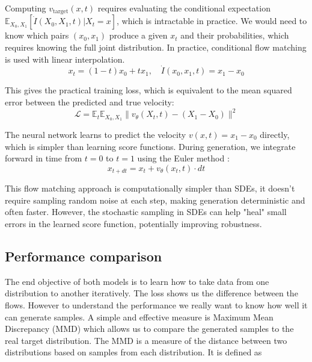 \documentclass[conference,a4paper]{IEEEtran}
\begin{document}
Computing $v_{\text{target}}(x, t)$ requires evaluating the conditional expectation $\mathbb{E}_{X_0, X_1}[\dot{I}(X_0, X_1, t) | X_t = x]$, which is intractable in practice. We would need to know which pairs $(x_0, x_1)$ produce a given $x_t$ and their probabilities, which requires knowing the full joint distribution. In practice, conditional flow matching is used with linear interpolation.
\begin{equation}
    x_t = (1-t)x_0 + tx_1, \quad \dot{I}(x_0, x_1, t) = x_1 - x_0
\end{equation}

\noindent This gives the practical training loss, which is equivalent to the mean squared error between the predicted and true velocity:
\begin{equation}
    \mathcal{L} = \mathbb{E}_t \mathbb{E}_{X_0, X_1} \|v_\theta(X_t, t) - (X_1 - X_0)\|^2
\end{equation}

The neural network learns to predict the velocity $v(x, t) = x_1 - x_0$ directly, which is simpler than learning score functions. During generation, we integrate forward in time from $t=0$ to $t=1$ using the Euler method \cite{burdenNumericalAnalysis2016}:
\begin{equation}
    x_{t+dt} = x_t + v_\theta(x_t, t) \cdot dt
\end{equation}

This flow matching approach is computationally simpler than SDEs, it doesn't require sampling random noise at each step, making generation deterministic and often faster. However, the stochastic sampling in SDEs can help "heal" small errors in the learned score function, potentially improving robustness.

\subsection{Performance comparison} 

The end objective of both models is to learn how to take data from one distribution to another iteratively. The loss shows us the difference between the flows. However to understand the performance we really want to know how well it can generate samples. A simple and effective measure is Maximum Mean Discrepancy (MMD) \cite{grettonKernelMethodTwoSample2008} which allows us to compare the generated samples to the real target distribution. The MMD is a measure of the distance between two distributions based on samples from each distribution. It is defined as
\end{document}
